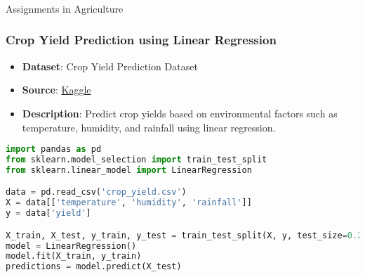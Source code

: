 \begin{frame}[fragile]\frametitle{}
\begin{center}
{\Large Assignments in Agriculture}
\end{center}
\end{frame}
 
\begin{frame}[fragile]\frametitle{Crop Yield Prediction using Linear Regression}
    \begin{itemize}
        \item \textbf{Dataset}: Crop Yield Prediction Dataset
        \item \textbf{Source}: \href{https://www.kaggle.com/datasets/sagnik1511/crop-yield-prediction}{Kaggle}
        \item \textbf{Description}: Predict crop yields based on environmental factors such as temperature, humidity, and rainfall using linear regression.
    \end{itemize}
    \begin{lstlisting}[language=Python]
import pandas as pd
from sklearn.model_selection import train_test_split
from sklearn.linear_model import LinearRegression

data = pd.read_csv('crop_yield.csv')
X = data[['temperature', 'humidity', 'rainfall']]
y = data['yield']

X_train, X_test, y_train, y_test = train_test_split(X, y, test_size=0.2)
model = LinearRegression()
model.fit(X_train, y_train)
predictions = model.predict(X_test)
    \end{lstlisting}
\end{frame}

